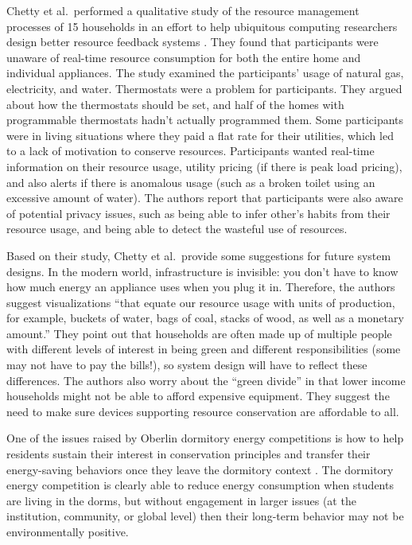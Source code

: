 Chetty et al.\ performed a qualitative study of the resource management processes of 15 households in an effort to help ubiquitous computing researchers design better resource feedback systems \cite{chetty-2008}. They found that participants were unaware of real-time resource consumption for both the entire home and individual appliances. The study examined the participants' usage of natural gas, electricity, and water. Thermostats were a problem for participants. They argued about how the thermostats should be set, and half of the homes with programmable thermostats hadn't actually programmed them. Some participants were in living situations where they paid a flat rate for their utilities, which led to a lack of motivation to conserve resources. Participants wanted real-time information on their resource usage, utility pricing (if there is peak load pricing), and also alerts if there is anomalous usage (such as a broken toilet using an excessive amount of water). The authors report that participants were also aware of potential privacy issues, such as being able to infer other's habits from their resource usage, and being able to detect the wasteful use of resources.

Based on their study, Chetty et al.\ provide some suggestions for future system designs. In the modern world, infrastructure is invisible: you don't have to know how much energy an appliance uses when you plug it in. Therefore, the authors suggest visualizations ``that equate our resource usage with units of production, for example, buckets of water, bags of coal, stacks of wood, as well as a monetary amount.'' They point out that households are often made up of multiple people with different levels of interest in being green and different responsibilities (some may not have to pay the bills!), so system design will have to reflect these differences. The authors also worry about the ``green divide'' in that lower income households might not be able to afford expensive equipment. They suggest the need to make sure devices supporting resource conservation are affordable to all.

One of the issues raised by Oberlin dormitory energy competitions is how to help residents sustain their interest in conservation principles and transfer their energy-saving behaviors once they leave the dormitory context \cite{Petersen09}. The dormitory energy competition is clearly able to reduce energy consumption when students are living in the dorms, but without engagement in larger issues (at the institution, community, or global level) then their long-term behavior may not be environmentally positive.

